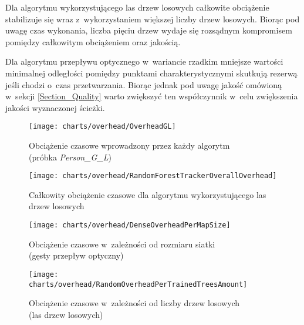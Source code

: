     Dla algorytmu wykorzystującego las drzew losowych całkowite obciążenie stabilizuje się wraz z~wykorzystaniem większej liczby drzew losowych. Biorąc pod uwagę czas wykonania, liczba pięciu drzew wydaje się rozsądnym kompromisem pomiędzy całkowitym obciążeniem oraz jakością.

    Dla algorytmu przepływu optycznego w~wariancie rzadkim mniejsze wartości minimalnej odległości pomiędzy punktami charakterystycznymi skutkują rezerwą jeśli chodzi o~czas przetwarzania. Biorąc jednak pod uwagę jakość omówioną w~sekcji \ref{Section_Quality} warto zwiększyć ten współczynnik w~celu zwiększenia jakości wyznaczonej ścieżki.

    \newpage
      \begin{figure}[!ht]
        \centering
        \texttt{[image: charts/overhead/OverheadGL]}
        \caption[Obciążenie czasowe wprowadzony przez każdy algorytm]
                {Obciążenie czasowe wprowadzony przez każdy algorytm\\(próbka \textit{Person\_G\_L})}
        \label{fig:OverheadGL}
      \end{figure}

      \begin{figure}[!ht]
        \centering
        \texttt{[image: charts/overhead/RandomForestTrackerOverallOverhead]}
        \caption[Całkowity obciążenie czasowe dla algorytmu wykorzystującego las drzew losowych]
                {Całkowity obciążenie czasowe dla algorytmu wykorzystującego las drzew losowych}
        \label{fig:RandomForestTrackerOverhead}
      \end{figure}

    \newpage
      \begin{figure}[!ht]
        \centering
        \texttt{[image: charts/overhead/DenseOverheadPerMapSize]}
        \caption[Obciążenie czasowe w~zależności od rozmiaru siatki]
                {Obciążenie czasowe w~zależności od rozmiaru siatki\\(gęsty przepływ optyczny)}
        \label{fig:SpecialisedDenseOverhead}
      \end{figure}

      \begin{figure}[!ht]
        \centering
        \texttt{[image: charts/overhead/RandomOverheadPerTrainedTreesAmount]}
        \caption[Obciążenie czasowe w~zależności od liczby drzew losowych]
                {Obciążenie czasowe w~zależności od liczby drzew losowych\\(las drzew losowych)}
        \label{fig:SpecialisedRandomOverhead}
      \end{figure}

